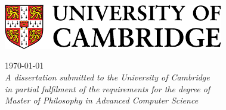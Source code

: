 \begin{titlepage}

\makeatletter
\begin{center}
\noindent
\huge
\@title \\
\end{center}

\begin{center}
\noindent
\huge
\@author \\
\Large
\college \\[24pt]
\includegraphics{images/logo-notext-colour.pdf}
\end{center}

\vspace{24pt}

\begin{center}
\noindent
\large
{
    \today \\
    \vspace{0.5em}
    \it A dissertation submitted to the University of Cambridge \\
in partial fulfilment of the requirements for the degree of \\
Master of Philosophy in Advanced Computer Science
}
\end{center}

\end{titlepage}
\makeatother








